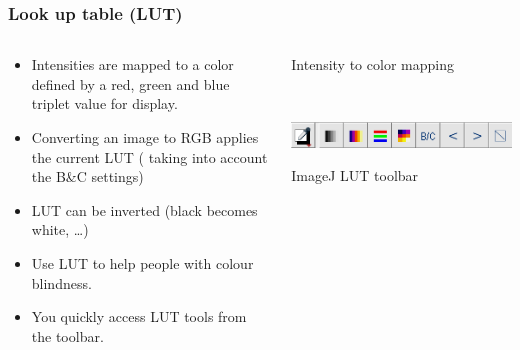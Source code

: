 \documentclass[ignorenonframetext,aspectratio=169,10pt,xcolor=table]{beamer}
\begin{document}
\begin{frame} \frametitle{Look up table (LUT)}

  \begin{columns}

    \begin{column}{0.6\textwidth}
      \begin{itemize} \setlength\itemsep{1em}
      \item Intensities are mapped to a color defined by a red, green
        and blue triplet value for display.
      \item Converting an image to RGB applies the current LUT
        ( taking into account the B\&C settings)
      \item LUT can be inverted (black becomes white, \dots)
      \item Use LUT to help people with colour blindness.
      \item You quickly access LUT tools from the toolbar.
      \end{itemize}
    \end{column}

    \begin{column}{0.4\textwidth}
      \begin{center}

        {\tiny Intensity to color mapping}

        ~~

        \includegraphics[width=\textwidth]{lut-tools.png}

        {\tiny ImageJ LUT toolbar}
      \end{center}
    \end{column}

  \end{columns}

\end{frame}
\end{document}
